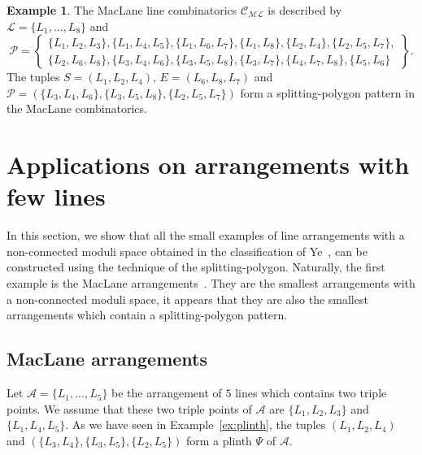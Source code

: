 \documentclass[11pt, a4paper]{amsart}
\theoremstyle{definition}
\newtheorem{example}[theorem]{Example}
\theoremstyle{remark}
\newcommand{\A}{\mathcal{A}}
\newcommand{\C}{\mathcal{C}}
\newcommand{\ML}{\mathcal{ML}}
\renewcommand{\P}{\mathcal{P}}
\renewcommand{\L}{\mathcal{L}}
\begin{document}
\begin{example}\label{ex:ML_SPP}
	The MacLane line combinatorics $\C_\ML$ is described by $\L=\{L_1,\dots,L_8\}$ and 
	\begin{equation*}
		\P=\left\{
			\begin{array}{c}
				\{ L_1, L_2, L_3 \}, \{ L_1, L_4, L_5 \}, \{ L_1, L_6, L_7 \}, \{ L_1, L_8 \},  \{ L_2, L_4 \}, \{ L_2, L_5, L_7 \}, \\
				 \{L_2, L_6,L_8\}, \{L_3, L_4, L_6 \}, \{ L_3, L_5, L_8 \}, \{ L_3, L_7 \}, \{ L_4, L_7, L_8 \}, \{ L_5, L_6 \}
			\end{array}
		\right\}.
	\end{equation*}
	The tuples $S=(L_1,L_2,L_4)$, $E=(L_6,L_8,L_7)$ and $\P=(\{L_3,L_4,L_6\},\{L_3,L_5,L_8\},\{L_2,L_5,L_7\})$ form a splitting-polygon pattern in the MacLane combinatorics.
\end{example}



\section{Applications on arrangements with few lines}\label{sec:examples}

In this section, we show that all the small examples of line arrangements with a non-connected moduli space obtained in the classification of Ye~\cite{Ye}, can be constructed using the technique of the splitting-polygon. Naturally, the first example is the MacLane arrangements~\cite{Mac}. They are the smallest arrangements with a non-connected moduli space, it appears that they are also the smallest arrangements which contain a splitting-polygon pattern.  

\subsection{MacLane arrangements}\label{sec:MacLane}\mbox{}

Let $\A=\{L_1,\dots,L_5\}$ be the arrangement of $5$ lines which contains two triple points. We assume that these two triple points of $\A$ are $\{L_1,L_2,L_3\}$ and $\{L_1,L_4,L_5\}$.  As we have seen in Example~\ref{ex:plinth}, the tuples $(L_1,L_2,L_4)$ and $(\{L_3,L_4\},\{L_3,L_5\},\{L_2,L_5\})$ form a plinth $\Psi$ of $\A$.
\end{document}
